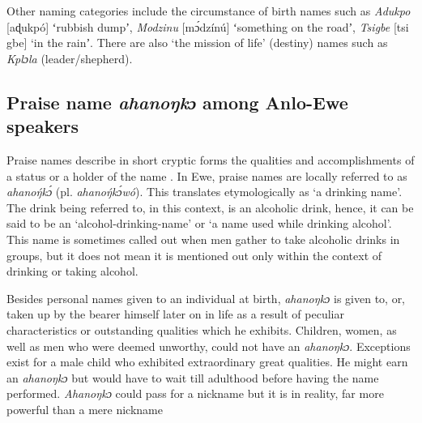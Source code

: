 \documentclass[output=paper]{langscibook}
\begin{document}
\begin{table}
\caption{Ewe day names for male and female children \citep{Atakpa1997}\label{table:nonlin}}
\end{table} 

Other naming categories include the circumstance of birth names such as {\textit{Adukpo}} [aɖukpó] ʻrubbish dumpʼ, {\textit {Modzinu}} [mɔ́dzínú] ʻsomething on the roadʼ, {\textit{Tsigbe}} [tsi gbe] ‘in the rainʼ. There are also ‘the mission of life’ (destiny) names such as {\textit{Kplɔla}} (leader/shepherd).

\subsection{Praise name {\textit{ahanoŋkɔ}} among Anlo-Ewe speakers}

Praise names describe in short cryptic forms the qualities and accomplishments of a status or a holder of the name \citep[216]{egblewogbe1984personal}. In Ewe, praise names are locally referred to as {\textit{ahanoŋ́kɔ́}} (pl. \textit{ahanoŋ́kɔ́wó}). This \citet{avorgbedor1983psycho} translates etymologically as `a drinking name'. The drink being  referred to, in this context, is an alcoholic drink, hence, it can be said to be an ‘alcohol-drinking-name’ or `a name used while drinking alcohol’. This name is sometimes called out when men gather to take alcoholic drinks in groups, but it does not mean it is mentioned out only within the context of drinking or taking alcohol.

Besides personal names given to an individual at birth, {\textit{ahanoŋkɔ}} is given to, or, taken up by the bearer himself later on in life as a result of peculiar characteristics or outstanding qualities which he exhibits.  Children, women, as well as men who were deemed unworthy, could not have an {\textit{ahanoŋkɔ}}.  Exceptions exist for a male child who exhibited extraordinary great qualities. He might earn an {\textit{ahanoŋkɔ}} but would have to wait till adulthood before having the name performed. {\textit{Ahanoŋkɔ}} could pass for a nickname but it is in reality, far more powerful than a mere nickname \citep{geurts2006enduring}
\end{document}
